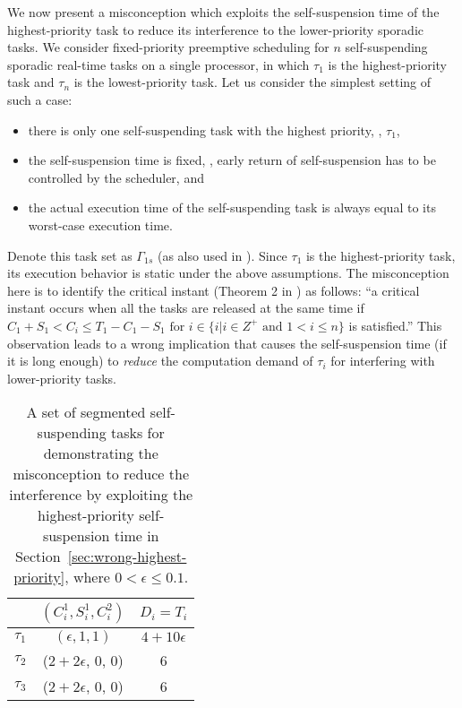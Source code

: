 We now present a misconception which exploits the  self-suspension time  of the highest-priority task to reduce its interference to the lower-priority sporadic tasks. 
We consider fixed-priority preemptive scheduling for $n$ self-suspending sporadic real-time tasks on a single processor, in which $\tau_1$ is the highest-priority task and $\tau_n$ is the lowest-priority task.
Let us consider the simplest setting of such a case:
\begin{itemize}
\item there is only one self-suspending task with the highest priority, \ie, $\tau_1$,
\item the self-suspension time is fixed, \ie, early return of self-suspension has to be controlled by the scheduler, and
\item the actual execution time of the self-suspending task is always equal to its worst-case execution time.
\end{itemize}
Denote this task set as $\Gamma_{1s}$ (as also used in \cite{RTSS-KimANR13}).  Since $\tau_1$ is the highest-priority task, its execution behavior is static under the above assumptions. The misconception here is to identify the critical instant  (Theorem 2 in \cite{RTSS-KimANR13}) as follows: ``a critical instant occurs when all the tasks are released at the same time if $C_1 +S_1 < C_i  \leq T_1-C_1-S_1 \mbox{ for } i \in\{i|i\in Z^{+} \mbox{ and } 1<i\leq n\}$ is satisfied.'' This observation leads to a wrong implication that causes the self-suspension time (if it is long enough) to \emph{reduce} the computation demand of $\tau_i$ for interfering with lower-priority tasks. 


\begin{table} [t]
\centering
    \begin{tabular}{|c|c|c|}
 \hline
        & $(C_i^1, S_i^1, C_i^2)$ &  $D_i=T_i$\\ 
        \hline
        $\tau_1$ & $(\epsilon, 1, 1)$ &  $4+10\epsilon$\\ 
        $\tau_2$ &  ($2+2\epsilon$, 0, 0) & 6  \\ 
        $\tau_3$ & ($2+2\epsilon$, 0, 0) & 6  \\
        \hline
    \end{tabular} 
    \caption{A set of segmented self-suspending tasks for demonstrating the misconception
to reduce the interference by exploiting the highest-priority self-suspension time in Section~\ref{sec:wrong-highest-priority}, where $0 < \epsilon \leq 0.1$.}
    \label{table:ex-highest-priority}
\end{table}


